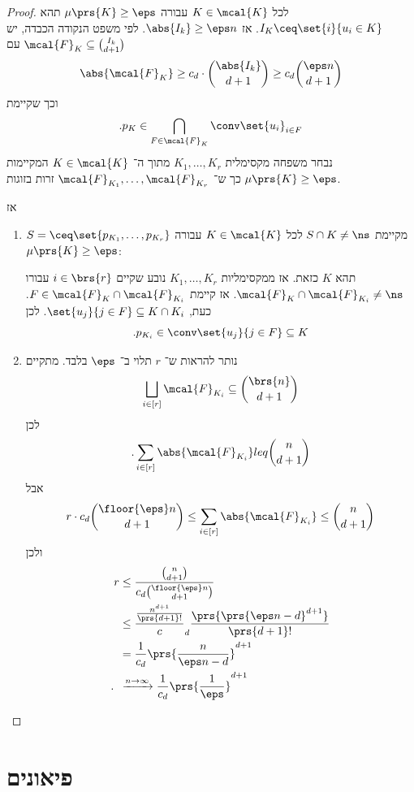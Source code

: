 \documentclass[a4paper,10pt,twoside,openany]{book}
\begin{document}
\begin{proof}
לכל
$K \in \mcal{K}$
עבורה
$\mu\prs{K} \geq \eps$
תהא
$I_K \ceq \set{i}{u_i \in K}$.
אז
$\abs{I_k} \geq \eps n$.
לפי משפט הנקודה הכבדה, יש
$\mcal{F}_K \subseteq \binom{I_k}{d+1}$
עם
\[\abs{\mcal{F}_K} \geq c_d \cdot \binom{\abs{I_k}}{d+1} \geq c_d \binom{\eps n}{d+1}\]
וכך שקיימת
\[\text{.} p_K \in \bigcap_{F \in \mcal{F}_K} \conv\set{u_i}_{i \in F}\]
נבחר משפחה מקסימלית
$K_1, \ldots, K_r$
מתוך ה־%
$K \in \mcal{K}$
המקיימות
$\mu\prs{K} \geq \eps$
כך ש־%
$\mcal{F}_{K_1}, \ldots, \mcal{F}_{K_r}$
זרות בזוגות.

אז
\begin{enumerate}
\item $S = \ceq \set{p_{K_1}, \ldots, p_{K_r}}$
מקיימת
$S \cap K \neq \ns$
לכל
$K \in \mcal{K}$
עבורה
$\mu\prs{K} \geq \eps$:

תהא
$K$
כזאת. אז ממקסימליות
$K_1, \ldots, K_r$
נובע שקיים
$i \in \brs{r}$
עבורו
$\mcal{F}_K \cap \mcal{F}_{K_i} \neq \ns$.
אז קיימת
$F \in \mcal{F}_K \cap \mcal{F}_{K_i}$.
כעת,
$\set{u_j}{j \in F} \subseteq K \cap K_i$.
לכן
\[\text{.} p_{K_i} \in \conv\set{u_j}{j \in F} \subseteq K\]

\item נותר להראות ש־%
$r$
תלוי ב־%
$\eps$
בלבד.
מתקיים
\begin{align*}
\bigsqcup_{i \in [r]} \mcal{F}_{K_i} \subseteq \binom{\brs{n}}{d+1}
\end{align*}
לכן
\[\text{.} \sum_{i \in [r]} \abs{\mcal{F}_{K_i}} \\leq \binom{n}{d+1}\]
אבל
\[r \cdot c_d \binom{\floor{\eps} n}{d+1} \leq \sum_{i \in [r]} \abs{\mcal{F}_{K_i}} \leq \binom{n}{d+1}\]
ולכן
\begin{align*}
r &\leq \frac{\binom{n}{d+1}}{c_d \binom{\floor{\eps}n}{d+1}}
\\&\leq \frac{\frac{n^{d+1}}{\prs{d+1}!}}c_d \frac{\prs{\prs{\eps n  - d}^{d+1}}}{\prs{d+1}!}
\\&= \frac{1}{c_d} \prs{\frac{n}{\eps n - d}}^{d+1}
\\ \text{.} \hphantom{r} &\xrightarrow{n\to\infty} \frac{1}{c_d} \prs{\frac{1}{\eps}}^{d+1}
\end{align*}
\end{enumerate}
\end{proof}

\chapter{פיאונים}
\end{document}

